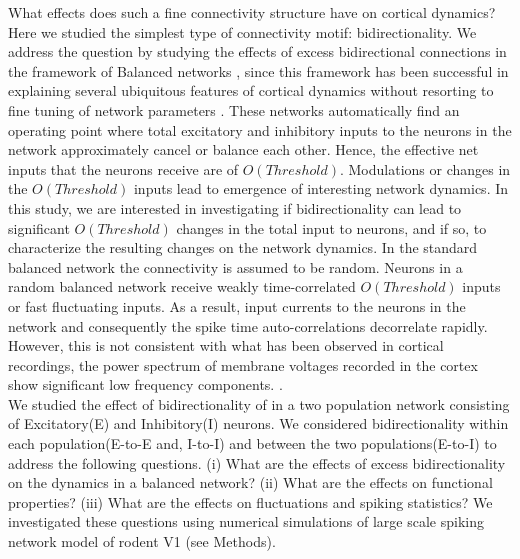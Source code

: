 What effects does such a fine connectivity structure have on cortical dynamics? Here we studied the simplest type of connectivity motif: bidirectionality. We address the question by studying the effects of excess bidirectional connections in the framework of Balanced networks \cite{carl1996, carl1998, carl2004}, since this framework has been successful in explaining several ubiquitous features of cortical dynamics without resorting to fine tuning of network parameters \cite{softky1993, Holt1996, roxin2011}. These networks automatically find an operating point where total excitatory and inhibitory inputs to the neurons in the network approximately cancel or balance each other.  Hence, the effective net inputs that the neurons receive are of $O(Threshold)$. Modulations or changes in the $O(Threshold)$ inputs lead to emergence of interesting network dynamics. In this study, we are interested in investigating if bidirectionality can lead to significant $O(Threshold)$ changes in the total input to neurons, and if so, to characterize the resulting changes on the network dynamics. In the standard balanced network the connectivity is assumed to be random. Neurons in a random balanced network receive weakly time-correlated $O(Threshold)$ inputs or fast fluctuating inputs. As a result, input currents to the neurons in the network and consequently the spike time auto-correlations decorrelate rapidly\cite{carl1996, carl1998}. However, this is not consistent with what has been observed in cortical recordings, the power spectrum of membrane voltages recorded in the cortex show significant low frequency components. \cite{Tan2014}.\\	
	
We studied the effect of bidirectionality of in a two population network consisting of Excitatory(E) and Inhibitory(I) neurons. We considered bidirectionality within each population(E-to-E and, I-to-I) and between the two populations(E-to-I) to address the following questions. (i) What are the effects of excess bidirectionality on the dynamics in a balanced network? (ii) What are the effects on functional properties? (iii) What are the effects on fluctuations and spiking statistics?
We investigated these questions using numerical simulations of large scale spiking network  model of rodent V1 (see Methods). \\
 
